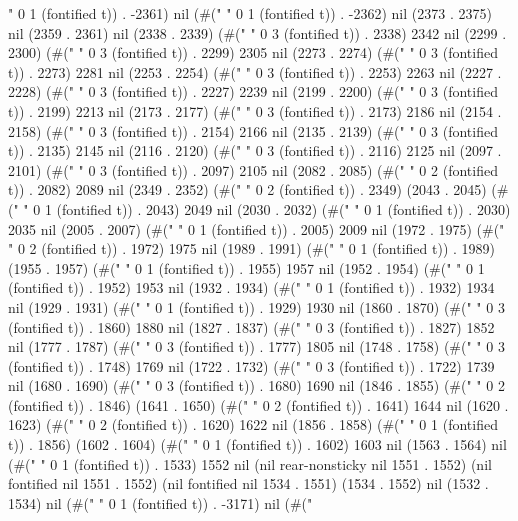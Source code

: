 " 0 1 (fontified t)) . -2361) nil (#(" " 0 1 (fontified t)) . -2362) nil (2373 . 2375) nil (2359 . 2361) nil (2338 . 2339) (#("   " 0 3 (fontified t)) . 2338) 2342 nil (2299 . 2300) (#("   " 0 3 (fontified t)) . 2299) 2305 nil (2273 . 2274) (#("   " 0 3 (fontified t)) . 2273) 2281 nil (2253 . 2254) (#("   " 0 3 (fontified t)) . 2253) 2263 nil (2227 . 2228) (#("   " 0 3 (fontified t)) . 2227) 2239 nil (2199 . 2200) (#("   " 0 3 (fontified t)) . 2199) 2213 nil (2173 . 2177) (#("   " 0 3 (fontified t)) . 2173) 2186 nil (2154 . 2158) (#("   " 0 3 (fontified t)) . 2154) 2166 nil (2135 . 2139) (#("   " 0 3 (fontified t)) . 2135) 2145 nil (2116 . 2120) (#("   " 0 3 (fontified t)) . 2116) 2125 nil (2097 . 2101) (#("   " 0 3 (fontified t)) . 2097) 2105 nil (2082 . 2085) (#("  " 0 2 (fontified t)) . 2082) 2089 nil (2349 . 2352) (#("  " 0 2 (fontified t)) . 2349) (2043 . 2045) (#(" " 0 1 (fontified t)) . 2043) 2049 nil (2030 . 2032) (#(" " 0 1 (fontified t)) . 2030) 2035 nil (2005 . 2007) (#(" " 0 1 (fontified t)) . 2005) 2009 nil (1972 . 1975) (#("  " 0 2 (fontified t)) . 1972) 1975 nil (1989 . 1991) (#(" " 0 1 (fontified t)) . 1989) (1955 . 1957) (#(" " 0 1 (fontified t)) . 1955) 1957 nil (1952 . 1954) (#(" " 0 1 (fontified t)) . 1952) 1953 nil (1932 . 1934) (#(" " 0 1 (fontified t)) . 1932) 1934 nil (1929 . 1931) (#(" " 0 1 (fontified t)) . 1929) 1930 nil (1860 . 1870) (#("   " 0 3 (fontified t)) . 1860) 1880 nil (1827 . 1837) (#("   " 0 3 (fontified t)) . 1827) 1852 nil (1777 . 1787) (#("   " 0 3 (fontified t)) . 1777) 1805 nil (1748 . 1758) (#("   " 0 3 (fontified t)) . 1748) 1769 nil (1722 . 1732) (#("   " 0 3 (fontified t)) . 1722) 1739 nil (1680 . 1690) (#("   " 0 3 (fontified t)) . 1680) 1690 nil (1846 . 1855) (#("  " 0 2 (fontified t)) . 1846) (1641 . 1650) (#("  " 0 2 (fontified t)) . 1641) 1644 nil (1620 . 1623) (#("  " 0 2 (fontified t)) . 1620) 1622 nil (1856 . 1858) (#(" " 0 1 (fontified t)) . 1856) (1602 . 1604) (#(" " 0 1 (fontified t)) . 1602) 1603 nil (1563 . 1564) nil (#(" " 0 1 (fontified t)) . 1533) 1552 nil (nil rear-nonsticky nil 1551 . 1552) (nil fontified nil 1551 . 1552) (nil fontified nil 1534 . 1551) (1534 . 1552) nil (1532 . 1534) nil (#(" " 0 1 (fontified t)) . -3171) nil (#("
